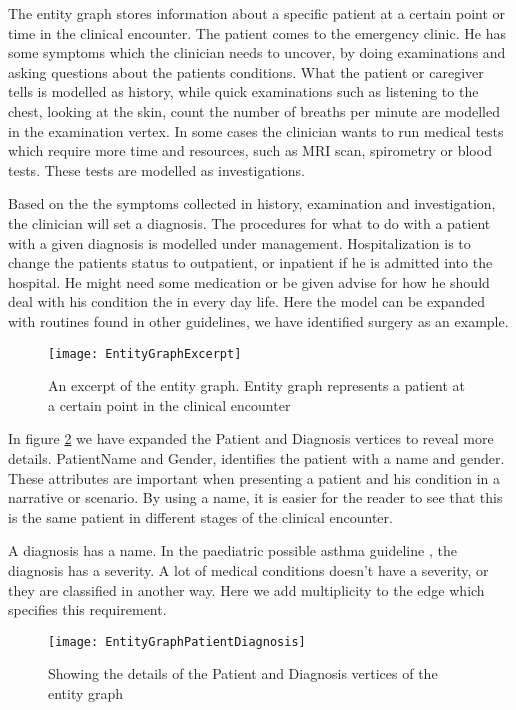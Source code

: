 The entity graph stores information about a specific patient at a certain point or time in the clinical encounter. The patient comes to the emergency clinic. He has some symptoms which the clinician needs to uncover, by doing examinations and asking questions about the patients conditions. What the patient or caregiver tells is modelled as history, while quick examinations such as listening to the chest, looking at the skin, count the number of breaths per minute are modelled in the examination vertex. In some cases the clinician wants to run medical tests which require more time and resources, such as MRI scan, spirometry or blood tests. These tests are modelled as investigations.

Based on the the symptoms collected in history, examination and investigation, the clinician will set a diagnosis. The procedures for what to do with a patient with a given diagnosis is modelled under management. Hospitalization is to change the patients status to outpatient, or inpatient if he is admitted into the hospital. He might need some medication or be given advise for how he should deal with his condition the in every day life. Here the model can be expanded with routines found in other guidelines, we have identified surgery as an example. 

\begin{figure}[h!]
	\texttt{[image: EntityGraphExcerpt]}
	\caption {An excerpt of the entity graph. Entity graph represents a patient at a certain point in the clinical encounter}
	\label{fig:EntityGraphExcerpt}
\end{figure}

In figure \ref{fig:EntityGraphPatientDiagnosis} we have expanded the Patient and Diagnosis vertices to reveal more details. PatientName and Gender, identifies the patient with a name and gender. These attributes are important when presenting a patient and his condition in a narrative or scenario. By using a name, it is easier for the reader to see that this is the same patient in different stages of the clinical encounter.

A diagnosis has a name. In the paediatric possible asthma guideline \parencite{RepublicofKeny2016}, the diagnosis has a severity. A lot of medical conditions doesn't have a severity, or they are classified in another way. Here we add multiplicity to the edge which specifies this requirement. 

\begin{figure}[h!]
	\texttt{[image: EntityGraphPatientDiagnosis]}
	\caption {Showing the details of the Patient and Diagnosis vertices of the entity graph}
	\label{fig:EntityGraphPatientDiagnosis}
\end{figure}

